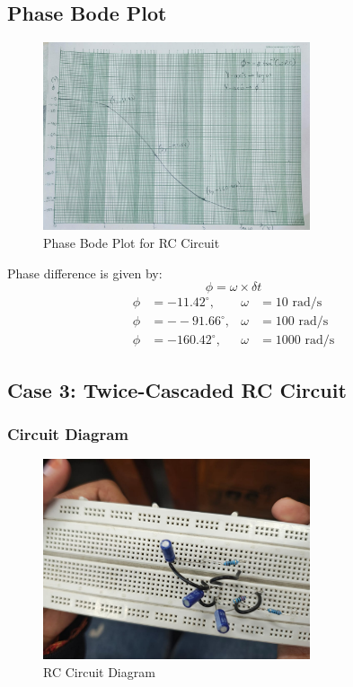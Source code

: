 \documentclass[a4paper,12pt]{article}
\begin{document}
\subsection{Phase Bode Plot}
\begin{figure}[H]
    \centering
    \includegraphics[width=0.7\textwidth]{fig/pbd2.jpeg} %
    \caption{Phase Bode Plot for RC Circuit}
\end{figure}
Phase difference is given by:
$$\phi = \omega \times \delta t$$
\begin{align}
\phi &= -11.42^\circ, & \omega &= 10 \text{ rad/s} \\
\phi &= --91.66^\circ, & \omega &= 100 \text{ rad/s} \\
\phi &= -160.42^\circ, & \omega &= 1000 \text{ rad/s}
\end{align}


\subsection{Case 3: Twice-Cascaded RC Circuit}
\subsubsection{Circuit Diagram}
\begin{figure}[H]
    \centering
    \includegraphics[width=0.7\textwidth]{fig/rc3.jpeg} %
    \caption{RC Circuit Diagram}
\end{figure}
\end{document}
